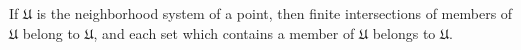 If $\mathfrak{U}$ is the neighborhood system of a point, then finite intersections of members of $\mathfrak{U}$ belong to $\mathfrak{U}$, and each set which contains a member of $\mathfrak{U}$ belongs to $\mathfrak{U}$.
